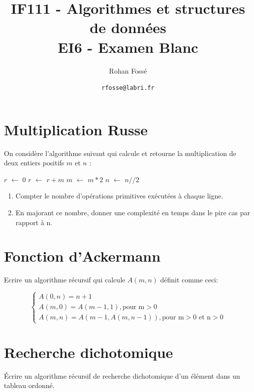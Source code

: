 \documentclass{article}[12pt]
\title{IF111 - Algorithmes et structures de données\\EI6 - Examen Blanc}
\date{\texttt{rfosse@labri.fr}}
\author{Rohan Fossé}
\newcommand*\Let[2]{\State #1 $\gets$ #2}
\begin{document}
\maketitle{}

\section{Multiplication Russe}
On considère l’algorithme suivant qui calcule et retourne la multiplication de deux entiers positifs $m$ et $n$ :

\begin{tcolorbox}
        \begin{algorithmic}[1]
    \Let{$r$}{$0$}
            \Let{$r$}{$r + m$}
        \EndIf
        \Let{$m$}{$m * 2$}
        \Let{$n$}{$n // 2$}
    \EndWhile
    \State{}
  \EndFunction
  \end{algorithmic}
 \end{tcolorbox} 

\begin{enumerate}
    \item Compter le nombre d’opérations primitives exécutées à chaque ligne.
    \item En majorant ce nombre, donner une complexité en temps dans le pire cas par rapport à n.
\end{enumerate}


\section{Fonction d'Ackermann}
Ecrire un algorithme récursif qui calcule $A(m, n)$ définit comme ceci:

$$
\left\{
    \begin{array}{ll}
        A(0,n) = n + 1 \\
        A(m,0) = A(m - 1, 1), \text{pour m} > \text{0}\\
        A(m,n) = A(m - 1,A(m,n - 1)), \text{pour m} > \text{0 et n} > \text{0}
    \end{array}
\right.
$$

\section{Recherche dichotomique}
Écrire un algorithme récursif de recherche dichotomique d'un élément dans un tableau ordonné.
\end{document}
